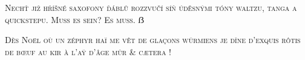 \documentclass{scrartcl}
\begin{document}
\textsc{Nechť již hříšné saxofony ďáblů rozzvučí síň úděsnými tóny waltzu, tanga a quickstepu. Muß es sein? Es muss. ẞ}

\textsc{Dès Noël où un zéphyr haï me vêt de glaçons würmiens je dîne d’exquis rôtis de bœuf au kir à l’aÿ d’âge mûr \& cætera !}
\end{document}
